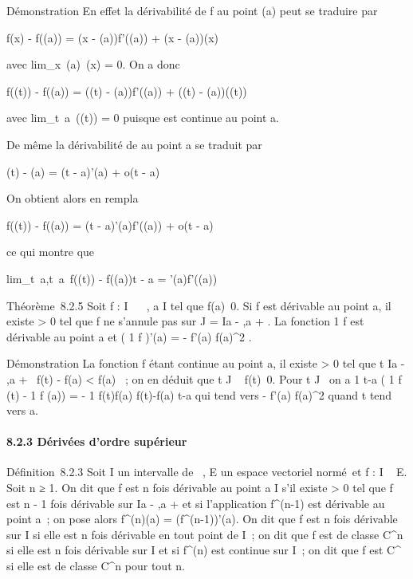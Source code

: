 \documentclass[]{article}
\begin{document}
Démonstration En effet la dérivabilité de f au point \phi(a) peut se
traduire par

f(x) - f(\phi(a)) = (x - \phi(a))f'(\phi(a)) + (x - \phi(a))\epsilon(x)

avec lim\_x\rightarrow~\phi(a)~\epsilon(x) = 0. On a donc

f(\phi(t)) - f(\phi(a)) = (\phi(t) - \phi(a))f'(\phi(a)) + (\phi(t) - \phi(a))\epsilon(\phi(t))

avec lim\_t\rightarrow~a~\epsilon(\phi(t)) = 0 puisque \phi est
continue au point a.

De même la dérivabilité de \phi au point a se traduit par

\phi(t) - \phi(a) = (t - a)\phi'(a) + o(t - a)

On obtient alors en rempla\ccant

f(\phi(t)) - f(\phi(a)) = (t - a)\phi'(a)f'(\phi(a)) + o(t - a)

ce qui montre que

lim\_t\rightarrow~a,t\neq~a~f(\phi(t))
- f(\phi(a))\over t - a = \phi'(a)f'(\phi(a))

Théorème~8.2.5 Soit f : I \rightarrow~ ~, a \in I tel que
f(a)\neq~0. Si f est dérivable au point a, il
existe \epsilon \textgreater{} 0 tel que f ne s'annule pas sur J = I\bigcap{]}a - \epsilon,a
+ \epsilon{[}. La fonction  1 \over f est dérivable au point
a et \left ( 1 \over f
\right )'(a) = - f'(a) \over
f(a)^2 .

Démonstration La fonction f étant continue au point a, il existe \epsilon
\textgreater{} 0 tel que t \in I\bigcap{]}a - \epsilon,a + \epsilon{[}\rigtharrow~\textbar{}f(t) -
f(a)\textbar{} \textless{} \textbar{}f(a)\textbar{}
 ~; on en déduit que t \in J \rigtharrow~
f(t)\neq~0. Pour t \in J
\diagdown\a\ on a  1 \over
t-a \left ( 1 \over f (t) - 1
\over f (a)\right ) = - 1
\over f(t)f(a)  f(t)-f(a) \over t-a
qui tend vers - f'(a) \over f(a)^2 quand t
tend vers a.

\paragraph{8.2.3 Dérivées d'ordre supérieur}

Définition~8.2.3 Soit I un intervalle de ~, E un espace vectoriel
normé~et f : I \rightarrow~ E. Soit n ≥ 1. On dit que f est n fois dérivable au
point a \in I s'il existe \eta \textgreater{} 0 tel que f est n - 1 fois
dérivable sur I\bigcap{]}a - \eta,a + \eta{[} et si l'application f^(n-1)
est dérivable au point a~; on pose alors f^(n)(a) =
(f^(n-1))'(a). On dit que f est n fois dérivable sur I si
elle est n fois dérivable en tout point de I~; on dit que f est de
classe C^n si elle est n fois dérivable sur I et si
f^(n) est continue sur I~; on dit que f est C^\infty~ si
elle est de classe C^n pour tout n.
\end{document}

